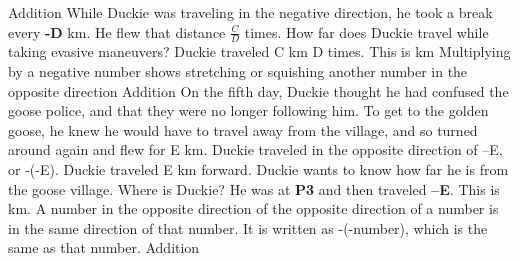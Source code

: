 \documentclass[a4paper,11pt ]{book}
\begin{document}
{Addition}
{While Duckie was traveling in the negative direction, he took a break every \textbf{-D} km. He flew that distance $\frac{C}{D}$ times. How far does Duckie travel while taking evasive maneuvers?}
{Duckie traveled C km D times. This is  km}
{Multiplying by a negative number shows stretching or squishing another number in the opposite direction}
{Addition}
{On the fifth day, Duckie thought he had confused the goose police, and that they were no longer following him. To get to the golden goose, he knew he would have to travel away from the village, and so turned around again and flew for E km. Duckie traveled in the opposite direction of –E, or -(-E). Duckie traveled E km forward. Duckie wants to know how far he is from the goose village. Where is Duckie?}
{He was at \textbf{P3} and then traveled \textbf{--E}. This is  km.}
{A number in the opposite direction of the opposite direction of a number is in the same direction of that number. It is written as -(-number), which is the same as  that number.}
{Addition}
\end{document}
